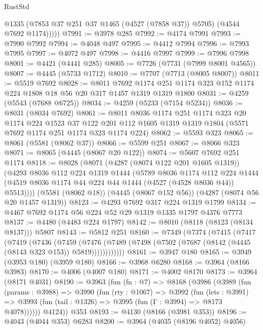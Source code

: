 \begin{lexlean}{RustStd}
\begin{coremodule}
            @1335
            (@7853 @37 @251 @37 @1465 (@4527 (@7858 @37)) @5705)
            (@4544 @7692 @1174)))))
@7991 := @3978 @285
@7992 := @4174 @7991
@7993 := @7990 @7992
@7994 := @4048 @497
@7995 := @4412 @7994
@7996 := @7993 @7995
@7997 := @4072 @497
@7998 := @4416 @7997
@7999 := @7996 @7998
@8001 := @4421 (@4441 @285)
@8005 := @7726 (@7731 (@7999 @8001 @4565))
@8007 := @4445 (@5733 @1712)
@8010 := @7707 (@7713 (@8005 @8007))
@8011 := @5519 @7692
@8028 := @8011
    @7692
    @1174
    @251
    @1174
    @323
    @152
    @1174
    @224
    @1808
    @18
    @56
    @20
    @317
    @1457
    @1319
    @1319
    @1800
@8031 := @4259 (@5543 (@7688 @6725))
@8034 := @4259 (@5233 (@7154 @5234))
@8036 := @8031 (@8034 @7692)
@8061 := @8011
    @8036
    @1174
    @251
    @1174
    @323
    @20
    @1174
    @224
    @1523
    @37
    @122
    @201
    @112
    @1605
    @1319
    @1319
    @1804
    (@5571 @7692 @1174 @251 @1174 @323 @1174 @224)
@8062 := @5593 @323
@8065 := @8061 (@5581 (@8062 @37))
@8066 := @5599 @251
@8067 := @8066 @323
@8071 := @8065 (@4445 (@8067 @20 @122))
@8074 := @5607 @7692 @251 @1174
@8118 := @8028
    (@8071
      (@4287 (@8074 @122 @201 @1605 @1319))
      (@4293
        @8036
        @112
        @224
        @1319
        @1444
        (@5789
          @8036
          @1174
          @112
          @224
          @1444
          (@4519 @8036 @1174 @44 @224 @44 @1444 (@4527 (@4528 @8036 @44)) @5513))))
    (@5581 (@8062 @18))
    (@4445 (@8067 @152 @56))
    (@4287 (@8074 @56 @20 @1457 @1319))
@8123 := @4293 @7692 @317 @224 @1319 @1799
@8134 := @4467 @7692 @1174 @56 @224 @52 @29 @1319 @1335 @1797 @4376 @7773
@8137 := @4480 (@4483 @224 @1797)
@8142 := @8010 (@8118 (@8123 (@8134 @8137))) @5807
@8143 := @5812 @251
@8160 := @7349
    (@7374
      (@7415
        (@7417
          (@7419
            (@7436
              (@7459
                (@7476
                  (@7489 (@7498 (@7502 (@7687 (@8142 (@4445 (@8143 @323 @153)) @5819))))))))))))
@8161 := @3947 @180
@8165 := @3949 (@3953 @180) (@3959 @180)
@8166 := @3968 @6280
@8168 := @3964 (@8166 @3983)
@8170 := @4006 (@4007 @180)
@8171 := @4002 @8170
@8173 := @3964 (@8171 @4031)
@8190 := @3963
    (fun (fn : @7) =>
    @8168
      (@3986
        (@3989
          (fun (params : @3988) =>
          @3990
            (fun (rty : @1067) =>
            @3992
              (fun (lets : @3991) =>
              @3993 (fun (tail : @1326) => @3995 (fun (Γ : @3994) => @8173 @4078))))))
        @4124))
    @353
@8193 := @4130 (@8166 (@3981 @353))
@8196 := @4043 (@4044 @353) @6283
@8200 := @3964 (@4035 (@8196 @4052) @4056)

\end{coremodule}
\end{lexlean}
